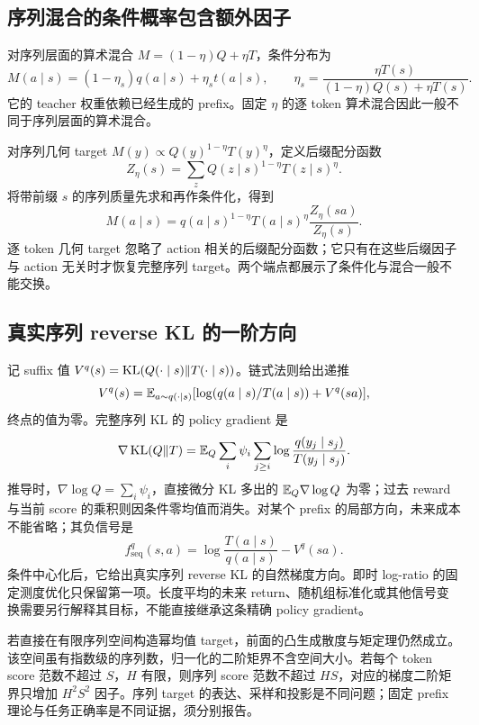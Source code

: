 \subsection{序列混合的条件概率包含额外因子}

对序列层面的算术混合 $M=(1-\eta)Q+\eta T$，条件分布为
\begin{equation}
 M(a\mid s)=(1-\eta_s)q(a\mid s)+\eta_st(a\mid s),\qquad
 \eta_s=\frac{\eta T(s)}{(1-\eta)Q(s)+\eta T(s)}.
\end{equation}
它的 teacher 权重依赖已经生成的 prefix。固定 $\eta$ 的逐 token 算术混合因此一般不同于序列层面的算术混合。

对序列几何 target $M(y)\propto Q(y)^{1-\eta}T(y)^\eta$，定义后缀配分函数
\begin{equation}
 Z_\eta(s)=\sum_zQ(z\mid s)^{1-\eta}T(z\mid s)^\eta.
\end{equation}
将带前缀 $s$ 的序列质量先求和再作条件化，得到
\begin{equation}
 M(a\mid s)=q(a\mid s)^{1-\eta}T(a\mid s)^\eta
 \frac{Z_\eta(sa)}{Z_\eta(s)}.
\end{equation}
逐 token 几何 target 忽略了 action 相关的后缀配分函数；它只有在这些后缀因子与 action 无关时才恢复完整序列 target。两个端点都展示了条件化与混合一般不能交换。

\subsection{真实序列 reverse KL 的一阶方向}

记 suffix 值 $V^q(s)=\operatorname{KL}(Q(\cdot\mid s)\Vert T(\cdot\mid s))$。链式法则给出递推
\begin{equation}
 V^q(s)=\mathbb E_{a\sim q(\cdot\mid s)}[\log(q(a\mid s)/T(a\mid s))+V^q(sa)],
\end{equation}
终点的值为零。完整序列 KL 的 policy gradient 是
\begin{equation}
 \nabla\operatorname{KL}(Q\Vert T)
 =\mathbb E_Q\sum_i\psi_i\sum_{j\ge i}\log\frac{q(y_j\mid s_j)}{T(y_j\mid s_j)}.
\end{equation}
推导时，$\nabla\log Q=\sum_i\psi_i$，直接微分 KL 多出的 $\mathbb E_Q\nabla\log Q$ 为零；过去 reward 与当前 score 的乘积则因条件零均值而消失。对某个 prefix 的局部方向，未来成本不能省略；其负信号是
\begin{equation}
 f_{\mathrm{seq}}^q(s,a)=\log\frac{T(a\mid s)}{q(a\mid s)}-V^q(sa).
\end{equation}
条件中心化后，它给出真实序列 reverse KL 的自然梯度方向。即时 log-ratio 的固定测度优化只保留第一项。长度平均的未来 return、随机组标准化或其他信号变换需要另行解释其目标，不能直接继承这条精确 policy gradient。

若直接在有限序列空间构造幂均值 target，前面的凸生成散度与矩定理仍然成立。该空间虽有指数级的序列数，归一化的二阶矩界不含空间大小。若每个 token score 范数不超过 $S$，$H$ 有限，则序列 score 范数不超过 $HS$，对应的梯度二阶矩界只增加 $H^2S^2$ 因子。序列 target 的表达、采样和投影是不同问题；固定 prefix 理论与任务正确率是不同证据，须分别报告。
